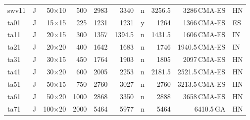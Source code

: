 {\begin{longtable}{llrrrrcrrl}
swv11 & J & 50$\times$10 & 500 & 2983 & 3340 & n & 3256.5 & 3286\,CMA-ES & HN \\
ta01 & J & 15$\times$15 & 225 & 1231 & 1231 & y & 1264 & 1366\,CMA-ES & ES \\
ta11 & J & 20$\times$15 & 300 & 1357 & 1394.5 & n & 1431.5 & 1606\,CMA-ES & IN \\
ta21 & J & 20$\times$20 & 400 & 1642 & 1683 & n & 1746 & 1940.5\,CMA-ES & IN \\
ta31 & J & 30$\times$15 & 450 & 1764 & 1903 & n & 1805 & 2097\,CMA-ES & HN \\
ta41 & J & 30$\times$20 & 600 & 2005 & 2253 & n & 2181.5 & 2521.5\,CMA-ES & HN \\
ta51 & J & 50$\times$15 & 750 & 2760 & 3027 & n & 2760 & 3213.5\,CMA-ES & HN \\
ta61 & J & 50$\times$20 & 1000 & 2868 & 3350 & n & 2888 & 3658\,CMA-ES & HN \\
ta71 & J & 100$\times$20 & 2000 & 5464 & 5977 & n & 5464 & 6410.5\,GA & HN \\
\end{longtable}}
